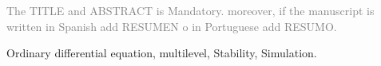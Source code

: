 

	\begin{remark*}
	\textcolor{gray}{
	The TITLE and ABSTRACT is Mandatory. moreover, if the manuscript is written in Spanish add  RESUMEN o in Portuguese add RESUMO.} 
	\end{remark*}	


\bigskip 
	\begin{abstract}
		In this work, the work is investigated and presented precisely, indicating the new contribution of knowledge, the latter is important, because if it is not, it runs the risk of not being accepted.
	\end{abstract}
	
	\begin{keywords}
		Ordinary differential equation, multilevel, Stability, Simulation.
	\end{keywords}

	
	
	
	

	
	
